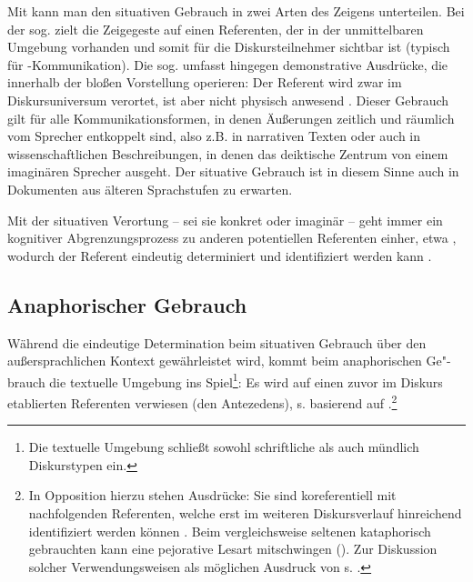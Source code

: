 Mit \textcite[]{Buhler1934} kann man den situativen  Gebrauch in zwei Arten des Zeigens unterteilen. Bei der sog.  zielt die Zeigegeste auf einen Referenten, der in der unmittelbaren Umgebung vorhanden und somit für die Diskursteilnehmer sichtbar ist (typisch für -Kommunikation). Die sog.  umfasst hingegen demonstrative Ausdrücke, die innerhalb der bloßen Vorstellung operieren: Der Referent wird zwar im Diskursuniversum verortet, ist aber nicht physisch anwesend \parencite[s. auch][222]{Himmelmann1996}. Dieser Gebrauch gilt für alle Kommunikationsformen, in denen Äußerungen zeitlich und räumlich vom Sprecher entkoppelt sind, also z.B. in narrativen Texten \parencite[95]{Diessel1999} oder auch in wissenschaftlichen Beschreibungen, in denen das deiktische Zentrum von einem imaginären Sprecher ausgeht. Der situative  Gebrauch ist in diesem Sinne auch in Dokumenten aus älteren Sprachstufen zu erwarten. 

Mit der situativen  Verortung -- sei sie konkret oder imaginär -- geht immer ein kognitiver Abgrenzungsprozess zu anderen potentiellen Referenten einher, etwa   \parencite[vgl.][70]{Bisle-Muller1991}, wodurch der Referent eindeutig determiniert und identifiziert werden kann \parencite{Hoffmann2009}. 

 
\subsection{Anaphorischer Gebrauch}\label{sec:anaphorisch}

Während die eindeutige Determination beim situativen  Gebrauch über den außersprachlichen Kontext gewährleistet wird, kommt beim anaphorischen  Ge"-brauch die textuelle Umgebung ins Spiel\footnote{Die textuelle Umgebung schließt sowohl schriftliche als auch mündlich Diskurstypen ein.}: Es wird auf einen zuvor im Diskurs etablierten Referenten verwiesen (den Antezedens), s.  basierend auf \textcite[][229]{Himmelmann1996}.{\footnote{In Opposition hierzu stehen  Ausdrücke: Sie sind koreferentiell  mit nachfolgenden Referenten, welche erst im weiteren Diskursverlauf  hinreichend identifiziert werden können \parencite[s.][161--162]{Veldre-Gerner2007}. Beim vergleichsweise seltenen kataphorisch gebrauchten  kann eine pejorative Lesart mitschwingen (). Zur Diskussion solcher Verwendungsweisen als möglichen Ausdruck von  s. \textcite[533]{deMulder2011}.}}

